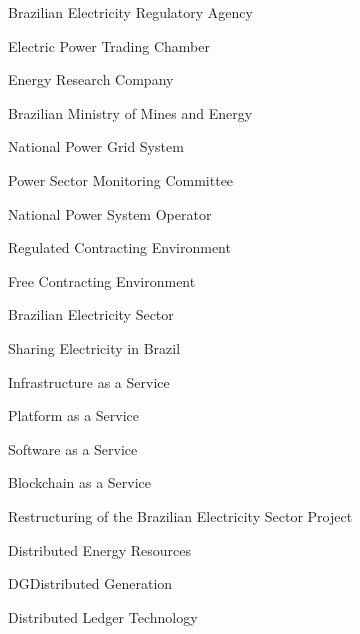 {Brazilian Electricity Regulatory Agency}

{Electric Power Trading Chamber}

{Energy Research Company}

{Brazilian Ministry of Mines and Energy}

{National Power Grid System}

{Power Sector Monitoring Committee}

{National Power System Operator}

{Regulated Contracting Environment}

{Free Contracting Environment}

{Brazilian Electricity Sector}

{Sharing Electricity in Brazil}

{Infrastructure as a Service}

{Platform as a Service}

{Software as a Service}

{Blockchain as a Service}

{Restructuring of the Brazilian Electricity Sector Project}

{Distributed Energy Resources}

{DG}{Distributed Generation}

{Distributed Ledger Technology}

